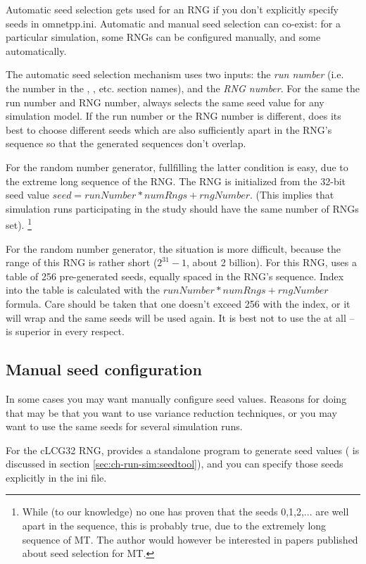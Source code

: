Automatic seed selection gets used for an RNG if you don't explicitly
specify seeds in omnetpp.ini. Automatic and manual seed selection can
co-exist: for a particular simulation, some RNGs can be configured
manually, and some automatically.

The automatic seed selection mechanism uses two inputs: the \textit{run number}
(i.e. the number in the \ttt{[Run 1]}, \ttt{[Run 2]}, etc. section names),
and the \textit{RNG number}. For the same the run number and RNG number,
{\opp} always selects the same seed value for any simulation model.
If the run number or the RNG number is different, {\opp} does its best
to choose different seeds which are also sufficiently apart in the RNG's sequence
so that the generated sequences don't overlap.

For the  random number generator, fullfilling the latter
condition is easy, due to the extreme long sequence of the RNG.
The RNG is initialized from the 32-bit seed value $seed = runNumber*numRngs + rngNumber$.
(This implies that simulation runs participating in the study should have
the same number of RNGs set).
    \footnote{While (to our knowledge) no one has proven that the seeds 0,1,2,...
    are well apart in the sequence, this is probably true, due to the extremely
    long sequence of MT. The author would however be interested in papers
    published about seed selection for MT.}

For the  random number generator, the situation is more difficult,
because the range of this RNG is rather short ($2^31-1$, about 2 billion).
For this RNG, {\opp} uses a table of 256 pre-generated seeds, equally spaced
in the RNG's sequence. Index into the table is calculated with the
$runNumber*numRngs + rngNumber$ formula. Care should be taken that
one doesn't exceed 256 with the index, or it will wrap and the
same seeds will be used again. It is best not to use the 
at all --  is superior in every respect.


\subsection{Manual seed configuration}

In some cases you may want manually configure seed values.
Reasons for doing that may be that you want to use variance reduction
techniques, or you may want to use the same seeds for several simulation
runs.

For the cLCG32 RNG, {\opp} provides a standalone program to generate
seed values ( is discussed in section
\ref{sec:ch-run-sim:seedtool}), and you can specify those seeds explicitly
in the ini file.

